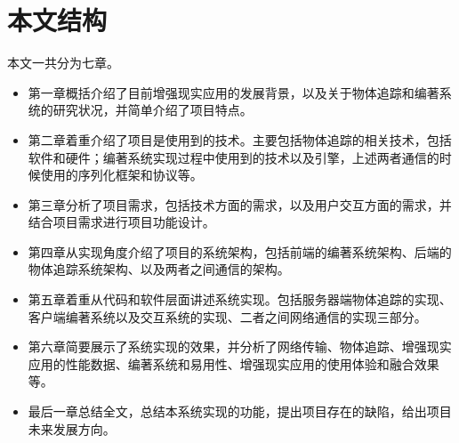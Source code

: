 \section{本文结构}
本文一共分为七章。
\begin{itemize}[noitemsep,topsep=0pt,parsep=0pt,partopsep=0pt]
\item 第一章概括介绍了目前增强现实应用的发展背景，以及关于物体追踪和编著系统的研究状况，并简单介绍了项目特点。
\item 第二章着重介绍了项目是使用到的技术。主要包括物体追踪的相关技术，包括软件和硬件；编著系统实现过程中使用到的技术以及引擎，上述两者通信的时候使用的序列化框架和协议等。
\item 第三章分析了项目需求，包括技术方面的需求，以及用户交互方面的需求，并结合项目需求进行项目功能设计。
\item 第四章从实现角度介绍了项目的系统架构，包括前端的编著系统架构、后端的物体追踪系统架构、以及两者之间通信的架构。
\item 第五章着重从代码和软件层面讲述系统实现。包括服务器端物体追踪的实现、客户端编著系统以及交互系统的实现、二者之间网络通信的实现三部分。
\item 第六章简要展示了系统实现的效果，并分析了网络传输、物体追踪、增强现实应用的性能数据、编著系统和易用性、增强现实应用的使用体验和融合效果等。
\item 最后一章总结全文，总结本系统实现的功能，提出项目存在的缺陷，给出项目未来发展方向。
\end{itemize}
